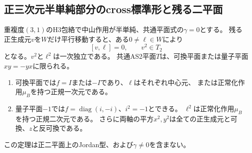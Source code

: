 \subsection{正三次元半単純部分のcross標準形と残る二平面}
\label{subsec:h3-positive3-global-cross}
\begin{theorem}\label{thm:h3-positive3-global-cross}
重複度$(3,1)$のH3包絡で中山作用が半単純、共通平面式の$\gamma=0$とする。
残る正生成元$v$を$W$だけ平行移動すると、ある$0\ne\ell\in W$により
\[
 [v,\ell]=0,\qquad v^2\in T_2
\]
となる。$v^2$と$\ell^2$は一次独立である。
共通AS2平面$T$は、可換平面または量子平面$xy=-yx$に限られる。
\begin{enumerate}
\item 可換平面では$f=I$または$-I$であり、$\ell$はそれぞれ中心元、
 または正常化作用$\mu_B$を持つ正規一次元である。
\item 量子平面$-1$では$f=\operatorname{diag}(i,-i)$、$i^2=-1$とできる。
 $\ell^2$は正常化作用$\mu_B$を持つ正規二次元である。
 さらに両軸の平方$x^2,y^2$は全ての正生成元と可換、$z$と反可換である。
\end{enumerate}
この定理は正二平面上のJordan型、および$\gamma\ne0$を含まない。
\end{theorem}
